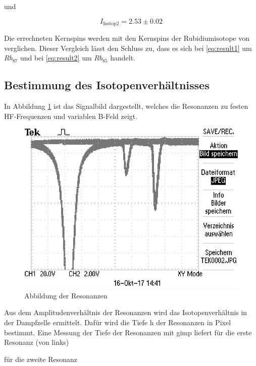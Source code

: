 und

\begin{equation}
I_\text{Isotop2} = 2.53 \pm 0.02
\label{eq:result2}
\end{equation}

Die errechneten Kernspins werden mit den Kernspins der Rubidiumisotope von \cite{coreSpin} verglichen. Dieser Vergleich lässt den Schluss zu,
dass es sich bei \ref{eq:result1} um $Rb_{87}$ und bei \ref{eq:result2} um $Rb_{85}$ handelt.

\subsection{Bestimmung des Isotopenverhältnisses}
In Abbildung \ref{resonanz} ist das Signalbild dargestellt, welches die Resonanzen zu festen
HF-Frequenzen und variablen B-Feld zeigt.

\begin{figure}[h]
\centering
\includegraphics[width=\textwidth]{img/TEK0002.JPG}
\caption{Abbildung der Resonanzen}
\label{resonanz}
\end{figure}


Aus dem Amplitudenverhältnis der Resonanzen wird das Isotopenverhältnis in der
Dampfzelle ermittelt. Dafür wird die Tiefe h der Resonanzen in Pixel bestimmt.
Eine Messung der Tiefe der Resonanzen mit gimp liefert für die erste Resonanz (von links)



für die zweite Resonanz



